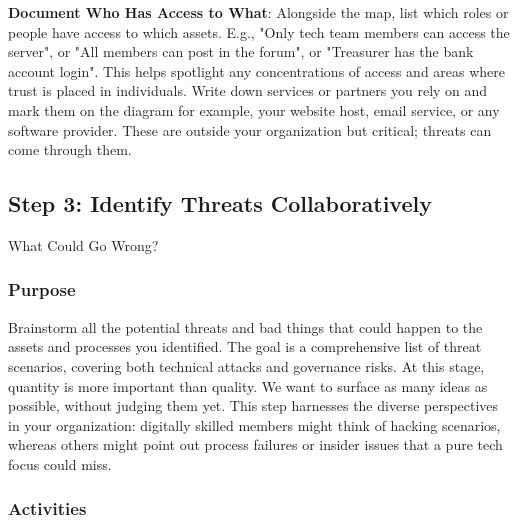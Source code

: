 \textbf{Document Who Has Access to What}: Alongside the map, list which roles or people have
access to which assets. E.g., "Only tech team members can access the server", or "All
members can post in the forum", or "Treasurer has the bank account login". This
helps spotlight any concentrations of access and areas where trust is placed in
individuals. Write down services or partners you rely on and mark them on the
diagram for example, your website host, email service, or any software
provider. These are outside your organization but critical; threats can come through them.

\subsection{Step 3: Identify Threats Collaboratively}
\label{subsec:Step3}

What Could Go Wrong?

\subsubsection{Purpose}

Brainstorm all the potential threats and bad things that could happen to the
assets and processes you identified. The goal is a comprehensive list of threat
scenarios, covering both technical attacks and governance risks. At this
stage, quantity is more important than quality. We want to surface as many
ideas as possible, without judging them yet. This step harnesses the diverse
perspectives in your organization: digitally skilled members might think
of hacking scenarios, whereas others might point out process failures or insider
issues that a pure tech focus could miss.

\subsubsection{Activities}

